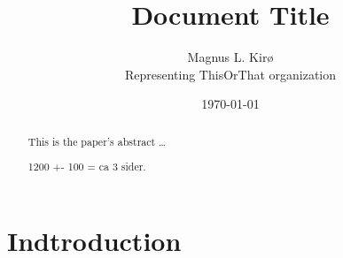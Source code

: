 \documentclass[12pt, a4paper]{article}
\title{
	Document Title
}
\author{
	Magnus L. Kirø \\
	Representing ThisOrThat organization %
}
\date{\today}
\begin{document}
\maketitle
{}

\begin{abstract}
This is the paper's abstract \ldots

1200 +- 100 = ca 3 sider. 
\end{abstract}

\section{Indtroduction}
\end{document}
